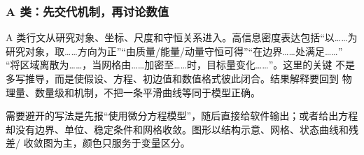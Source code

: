 \subsubsection{A 类：先交代机制，再讨论数值}

A 类行文从研究对象、坐标、尺度和守恒关系进入。高信息密度表达包括“以……为
研究对象，取……方向为正”“由质量/能量/动量守恒可得”“在边界……处满足……”
“将区域离散为……，当网格由……加密至……时，目标量变化……”。这里的关键
不是多写推导，而是使假设、方程、初边值和数值格式彼此闭合。结果解释要回到
物理量、数量级和机制，不把一条平滑曲线等同于模型正确。

需要避开的写法是先报“使用微分方程模型”，随后直接给软件输出；或者给出方程
却没有边界、单位、稳定条件和网格收敛。图形以结构示意、网格、状态曲线和残差/
收敛图为主，颜色只服务于变量区分。


